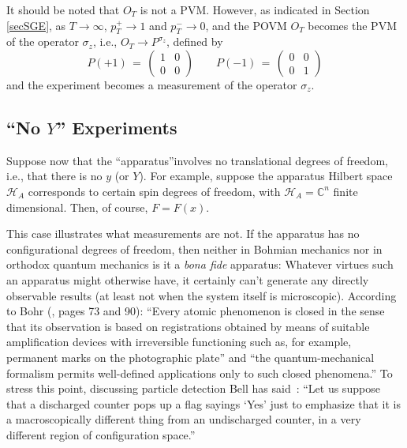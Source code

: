 \documentclass[12pt]{article}
\newcommand{\BM}{Bohmian mechanics}
\renewcommand{\H}{\mbox{$\mathcal{H}$}}
\newcommand{\CC}{\mathbb{C}}
\begin{document}
It should be noted that $O_{T}$ is not a PVM. However, as indicated in
Section \ref{secSGE}, as $T\to\infty$, $p_{T}^+\to 1$ and $p_{T}^-\to
0$, and the POVM $O_{T}$ becomes the PVM of the operator $\sigma_{z}$,
i.e., $O_{T}\to P^{\sigma_{z}}$, defined by
\begin{equation}
\label{opm}
P(+1) \,=\,
\left( \begin{array}{cc} 1 & 0 \\ 0 & 0 \end{array} \right) \qquad
P{(-1)}
\,=\, \left( \begin{array}{cc} 0 & 0 \\ 0 & 1 \end{array} \right)
\end{equation}
and the experiment becomes a measurement of the operator $\sigma_{z}$.




\subsection{``No $Y$'' Experiments}
Suppose now that the ``apparatus''involves no translational degrees of
freedom, i.e., that there is no $y$ (or $Y$). For example, suppose the
apparatus Hilbert space $\H_A$ corresponds to certain spin degrees of
freedom, with $\H_{A}= \CC^n$ finite dimensional. Then, of course,
$F=F(x)$.


This case illustrates what measurements are not.  If the apparatus has
no configurational degrees of freedom, then neither in \BM{} nor in
orthodox quantum mechanics is it a \emph{bona fide} apparatus:
Whatever virtues such an apparatus might otherwise have, it certainly
can't generate any directly observable results (at least not when the
system itself is microscopic).  According to Bohr (\cite{Boh58}, pages
73 and 90): ``Every atomic phenomenon is closed in the sense that its
observation is based on registrations obtained by means of suitable
amplification devices with irreversible functioning such as, for
example, permanent marks on the photographic plate'' and ``the
quantum-mechanical formalism permits well-defined applications only to
such closed phenomena.''  To stress this point, discussing particle
detection Bell has said~\cite{Bel80}: ``Let us suppose that a
discharged counter pops up a flag sayings `Yes' just to emphasize that
it is a macroscopically different thing {}from an undischarged
counter, in a very different region of configuration space.''
\end{document}
